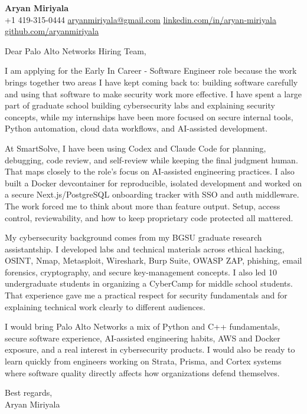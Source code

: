 \documentclass[letterpaper,11pt]{article}
\begin{document}
\begin{center}
    {\Large \textbf{Aryan Miriyala}}\\
    \vspace{2pt}
    +1 419-315-0444 \textbar{} \href{mailto:aryanmiriyala@gmail.com}{aryanmiriyala@gmail.com} \textbar{} \href{https://www.linkedin.com/in/aryan-miriyala-7788a21b6/}{linkedin.com/in/aryan-miriyala} \textbar{} \href{https://github.com/aryanmiriyala}{github.com/aryanmiriyala}
\end{center}

\vspace{10pt}

Dear Palo Alto Networks Hiring Team,

I am applying for the Early In Career - Software Engineer role because the work brings together two areas I have kept coming back to: building software carefully and using that software to make security work more effective. I have spent a large part of graduate school building cybersecurity labs and explaining security concepts, while my internships have been more focused on secure internal tools, Python automation, cloud data workflows, and AI-assisted development.

At SmartSolve, I have been using Codex and Claude Code for planning, debugging, code review, and self-review while keeping the final judgment human. That maps closely to the role's focus on AI-assisted engineering practices. I also built a Docker devcontainer for reproducible, isolated development and worked on a secure Next.js/PostgreSQL onboarding tracker with SSO and auth middleware. The work forced me to think about more than feature output. Setup, access control, reviewability, and how to keep proprietary code protected all mattered.

My cybersecurity background comes from my BGSU graduate research assistantship. I developed labs and technical materials across ethical hacking, OSINT, Nmap, Metasploit, Wireshark, Burp Suite, OWASP ZAP, phishing, email forensics, cryptography, and secure key-management concepts. I also led 10 undergraduate students in organizing a CyberCamp for middle school students. That experience gave me a practical respect for security fundamentals and for explaining technical work clearly to different audiences.

I would bring Palo Alto Networks a mix of Python and C++ fundamentals, secure software experience, AI-assisted engineering habits, AWS and Docker exposure, and a real interest in cybersecurity products. I would also be ready to learn quickly from engineers working on Strata, Prisma, and Cortex systems where software quality directly affects how organizations defend themselves.

\vspace{8pt}

Best regards,\\
Aryan Miriyala
\end{document}

